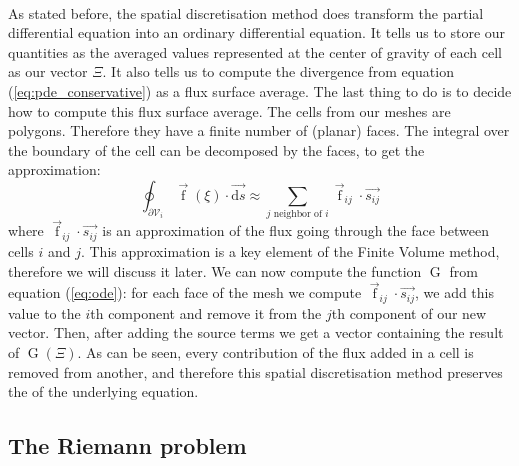       \paragraph{}
      As stated before, the spatial discretisation method does transform the partial differential equation into an ordinary differential equation.
      It tells us to store our quantities as the averaged values represented at the center of gravity of each cell as our vector $\Xi$.
      It also tells us to compute the divergence from equation (\ref{eq:pde_conservative}) as a flux surface average.
      The last thing to do is to decide how to compute this flux surface average.
      The cells from our meshes are polygons.
      Therefore they have a finite number of (planar) faces.
      The integral over the boundary of the cell can be decomposed by the faces, to get the approximation:
      \begin{equation}
        \oint_{\partial\mathcal{V}_i} \vec{\operatorname{f}}\left(\xi\right) \cdot \vec{\mathrm{d}s} \approx \sum_{j\textrm{ neighbor of } i} \vec{\operatorname{f}}_{ij} \cdot \vec{s_{ij}}
      \end{equation}
      where $\vec{\operatorname{f}}_{ij} \cdot \vec{s_{ij}}$ is an approximation of the flux going through the face between cells $i$ and $j$.
      This approximation is a key element of the Finite Volume method, therefore we will discuss it later.
      We can now compute the function $\operatorname{G}$ from equation (\ref{eq:ode}): for each face of the mesh we compute $\vec{\operatorname{f}}_{ij} \cdot \vec{s_{ij}}$, we add this value to the $i$th component and remove it from the $j$th component of our new vector.
      Then, after adding the source terms we get a vector containing the result of $\operatorname{G}\left(\Xi\right)$.
      As can be seen, every contribution of the flux added in a cell is removed from another, and therefore this spatial discretisation method preserves the  of the underlying equation.


    \subsection{The Riemann problem}

